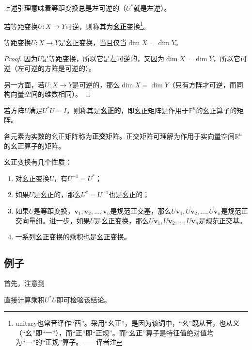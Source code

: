 上述引理意味着等距变换总是左可逆的（$U^*$就是左逆）。

\begin{definition*}
    若等距变换$U:X\to Y$可逆，则称其为{\bf 幺正}变换\footnote{unitary也常音译作“酉”。采用“幺正”，是因为该词中，“幺”既从音，也从义（“幺”即“一”），而“正”即“正规”。而“幺正”算子是特征值绝对值均为“一”的“正规”算子。——译者注}。
\end{definition*}

\begin{proposition}\label{prop:iso_to_uni}
    等距变换$U:X\to Y$是幺正变换，当且仅当$\dim X=\dim Y$。
\end{proposition}
\begin{proof}
    因为$U$是等距变换，所以它是左可逆的，又因为$\dim X=\dim Y$，所以它可逆（左可逆的方阵是可逆的）。

    另一方面，若$U:X\to Y$是可逆的，那么$\dim X=\dim Y$（只有方阵才可逆，而同构向量空间的维数相同）。
\end{proof}

若方阵$U$满足$U^*U=I$，则称其是{\bf 幺正的}，即幺正矩阵是作用于$\mathbb{F}^n$的幺正算子的矩阵。

各元素为实数的幺正矩阵称为{\bf 正交}矩阵。正交矩阵可理解为作用于实向量空间$\mathbb{R}^n$的幺正算子的矩阵。

幺正变换有几个性质：
\begin{enumerate}
    \item 对幺正变换$U$，有$U^{-1}=U^*$；
    \item 如果$U$是幺正的，那么$U^*=U^{-1}$也是幺正的；
    \item 如果$U$是等距变换，$\mathbf{v}_{1},\mathbf{v}_{2},\ldots,\mathbf{v}_{n}$是规范正交基，那么$U\mathbf{v}_1,$\linebreak $U\mathbf{v}_2,\ldots,U\mathbf{v}_n$是规范正交向量组。进一步，如果$U$是幺正变换，那么$U\mathbf{v}_1,U\mathbf{v}_2,\ldots,U\mathbf{v}_n$是规范正交基。
    \item 一系列幺正变换的乘积也是幺正变换。
\end{enumerate}

\subsection{例子}

首先，注意到

\begin{center}
\end{center}
直接计算乘积$U^*U$即可检验该结论。


